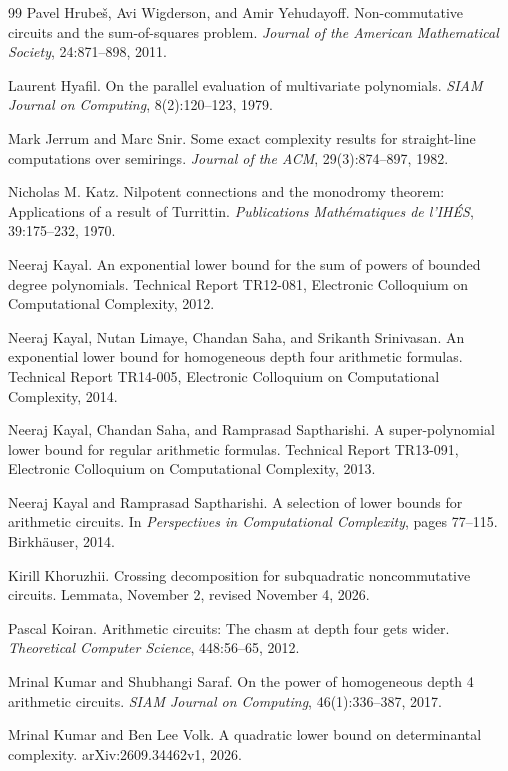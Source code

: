 \begin{thebibliography}{99}
Pavel Hrube\v{s}, Avi Wigderson, and Amir Yehudayoff. Non-commutative circuits and the
sum-of-squares problem. \emph{Journal of the American Mathematical Society}, 24:871--898, 2011.

Laurent Hyafil. On the parallel evaluation of multivariate polynomials. \emph{SIAM Journal on
Computing}, 8(2):120--123, 1979.

Mark Jerrum and Marc Snir. Some exact complexity results for straight-line computations over
semirings. \emph{Journal of the ACM}, 29(3):874--897, 1982.

Nicholas M. Katz. Nilpotent connections and the monodromy theorem: Applications of a result
of Turrittin. \emph{Publications Mathématiques de l'IHÉS}, 39:175--232, 1970.

Neeraj Kayal. An exponential lower bound for the sum of powers of bounded degree polynomials.
Technical Report TR12-081, Electronic Colloquium on Computational Complexity, 2012.

Neeraj Kayal, Nutan Limaye, Chandan Saha, and Srikanth Srinivasan. An exponential lower
bound for homogeneous depth four arithmetic formulas. Technical Report TR14-005, Electronic
Colloquium on Computational Complexity, 2014.

Neeraj Kayal, Chandan Saha, and Ramprasad Saptharishi. A super-polynomial lower bound for
regular arithmetic formulas. Technical Report TR13-091, Electronic Colloquium on Computational Complexity, 2013.

Neeraj Kayal and Ramprasad Saptharishi. A selection of lower bounds for arithmetic circuits.
In \emph{Perspectives in Computational Complexity}, pages 77--115. Birkhäuser, 2014.

Kirill Khoruzhii. Crossing decomposition for subquadratic noncommutative circuits. Lemmata,
November 2, revised November 4, 2026.

Pascal Koiran. Arithmetic circuits: The chasm at depth four gets wider. \emph{Theoretical Computer
Science}, 448:56--65, 2012.

Mrinal Kumar and Shubhangi Saraf. On the power of homogeneous depth 4 arithmetic circuits.
\emph{SIAM Journal on Computing}, 46(1):336--387, 2017.

Mrinal Kumar and Ben Lee Volk. A quadratic lower bound on determinantal complexity.
arXiv:2609.34462v1, 2026.


\end{thebibliography}
